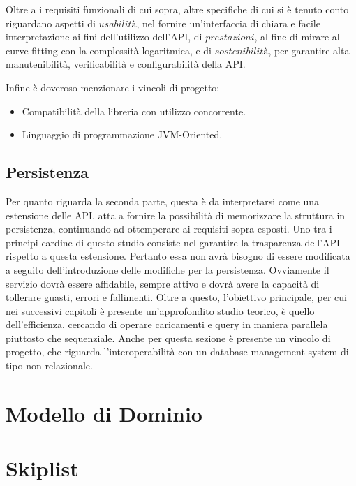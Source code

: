 	Oltre a i requisiti funzionali di cui sopra, altre specifiche di cui si è tenuto conto riguardano aspetti di $ usabilità $, nel fornire un'interfaccia di chiara e facile interpretazione ai fini dell'utilizzo dell'API, di $ prestazioni $, al fine di mirare al curve fitting con la complessità logaritmica, e di $ sostenibilità $, per garantire alta manutenibilità, verificabilità e configurabilità della API.
	
	Infine è doveroso menzionare i vincoli di progetto:
	\begin{itemize}
		\item Compatibilità della libreria con utilizzo concorrente.
		\item Linguaggio di programmazione JVM-Oriented.
	\end{itemize}

	\subsection{Persistenza}
	
	Per quanto riguarda la seconda parte, questa è da interpretarsi come una estensione delle API, atta a fornire la possibilità di memorizzare la struttura in persistenza, continuando ad ottemperare ai requisiti sopra esposti. Uno tra i principi cardine di questo studio consiste nel garantire la trasparenza dell'API rispetto a questa estensione. Pertanto essa non avrà bisogno di essere modificata a seguito dell'introduzione delle modifiche per la persistenza. Ovviamente il servizio dovrà essere affidabile, sempre attivo e dovrà avere la capacità di tollerare guasti, errori e fallimenti.
	Oltre a questo, l'obiettivo principale, per cui nei successivi capitoli è presente un'approfondito studio teorico, è quello dell'efficienza, cercando di operare caricamenti e query in maniera parallela piuttosto che sequenziale.
	Anche per questa sezione è presente un vincolo di progetto, che riguarda l'interoperabilità con un database management system di tipo non relazionale.

\section{Modello di Dominio}

	
	
\section{Skiplist}

